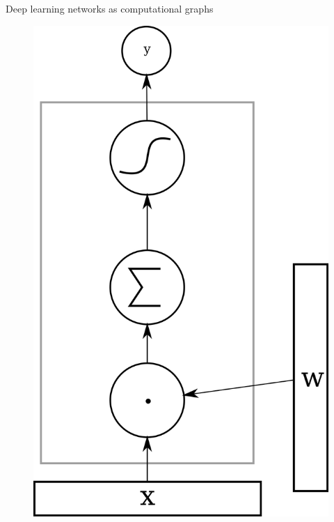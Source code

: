 \documentclass[10pt]{beamer}
\begin{document}
\begin{frame}{Deep learning networks as computational graphs}
{\begin{figure}
		\includegraphics[scale=0.4]{flowgraph2}
	\end{figure}}
\end{frame}
\end{document}
